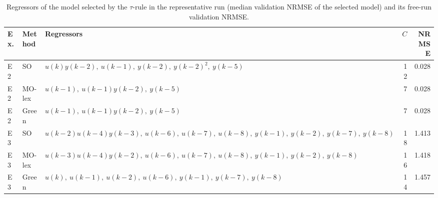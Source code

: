 \begin{table}[t]
\centering
\caption{Regressors of the model selected by the $\tau$-rule in the representative run (median validation NRMSE of the selected model) and its free-run validation NRMSE.}
\label{tab:models}
\setlength{\tabcolsep}{3pt}
\footnotesize
\begin{tabular}{llp{8.5cm}rr}
\toprule
Ex. & Method & Regressors & $C$ & NRMSE \\
\midrule
E2 & SO & $u(k) y(k-2),\ u(k-1),\ y(k-2),\ y(k-2)^{2},\ y(k-5)$ & 12 & 0.028 \\
E2 & MO-lex & $u(k-1),\ u(k-1) y(k-2),\ y(k-5)$ & 7 & 0.028 \\
E2 & Green & $u(k-1),\ u(k-1) y(k-2),\ y(k-5)$ & 7 & 0.028 \\
\midrule
E3 & SO & $u(k-2) u(k-4) y(k-3),\ u(k-6),\ u(k-7),\ u(k-8),\ y(k-1),\ y(k-2),\ y(k-7),\ y(k-8)$ & 18 & 1.413 \\
E3 & MO-lex & $u(k-3) u(k-4) y(k-2),\ u(k-6),\ u(k-7),\ u(k-8),\ y(k-1),\ y(k-2),\ y(k-8)$ & 16 & 1.418 \\
E3 & Green & $u(k),\ u(k-1),\ u(k-2),\ u(k-6),\ y(k-1),\ y(k-7),\ y(k-8)$ & 14 & 1.457 \\
\bottomrule
\end{tabular}
\end{table}
